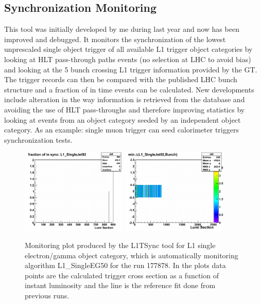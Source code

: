 \subsection{Synchronization Monitoring}

This tool was initially developed by me during last year and now has been improved and debugged. It monitors
the synchronization of the lowest unprescaled single object trigger of all available L1 trigger object categories
by looking at HLT pass-through paths events (no selection at LHC to avoid bias) and looking at the 5 bunch crossing
L1 trigger information provided by the GT. The trigger records can then be compared with the published LHC bunch
structure and a fraction of in time events can be calculated. New developments include alteration in the way
information is retrieved from the database and avoiding the use of HLT pass-throughs and therefore improving statistics
by looking at events from an object category seeded by an independent object category. As an example: single muon
trigger can seed calorimeter triggers synchronization tests.

\begin{figure}[!htb]
\centering
\includegraphics[width=0.45\textwidth]{Chapter03/L1TOnline/Images/Run177878_Jet_SynchronizationCertification.png}
\includegraphics[width=0.45\textwidth]{Chapter03/L1TOnline/Images/Run177878_Jet_SynchronizationTest.png}
\caption{Monitoring plot produced by the L1TSync tool for L1 single electron/gamma object category, which is
automatically monitoring algorithm L1\_SingleEG50 for the run 177878. In the plots data points are the calculated
trigger cross section as a function of instant luminosity and the line is the reference fit done from previous runs.}
\label{figure_ServiceWork_L1TSync}
\end{figure}

